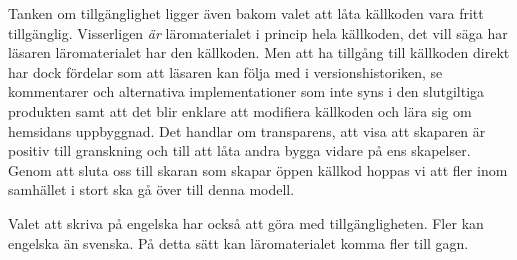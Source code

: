 Tanken om tillgänglighet ligger även bakom valet att låta källkoden vara fritt
tillgänglig. Visserligen \textit{är} läromaterialet i princip hela källkoden, det vill säga
har läsaren läromaterialet har den källkoden. Men att ha tillgång till källkoden
direkt har dock fördelar som att läsaren kan följa med i versionshistoriken,
se kommentarer och alternativa implementationer som inte syns i den slutgiltiga
produkten samt att det blir enklare att modifiera källkoden och lära sig om
hemsidans uppbyggnad. Det handlar om transparens, att visa att skaparen är positiv till granskning
och till att låta andra bygga vidare på ens skapelser. Genom att
sluta oss till skaran som skapar öppen källkod hoppas vi att fler inom samhället
i stort ska gå över till denna modell.

Valet att skriva på engelska har också att göra med tillgängligheten. Fler kan
engelska än svenska. På detta sätt kan läromaterialet komma fler till gagn.

